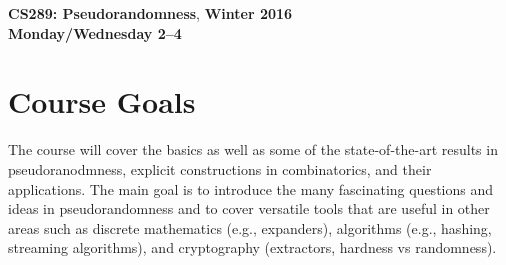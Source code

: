 \documentclass{article}[11pt]
\begin{document}
\sf

{\Large
\begin{center}
\textbf{CS289: Pseudorandomness}, \textbf{Winter 2016} \\
\textbf{Monday/Wednesday 2--4}
\end{center}
}

\section{Course Goals}
The course will cover the basics as well as some of the state-of-the-art results in pseudoranodmness, explicit constructions in combinatorics, and their applications. The main goal is to introduce the many fascinating questions and ideas in pseudorandomness and to cover versatile tools that are useful in other areas such as discrete mathematics (e.g., expanders), algorithms (e.g., hashing, streaming algorithms), and cryptography (extractors, hardness vs randomness). %
\end{document}
